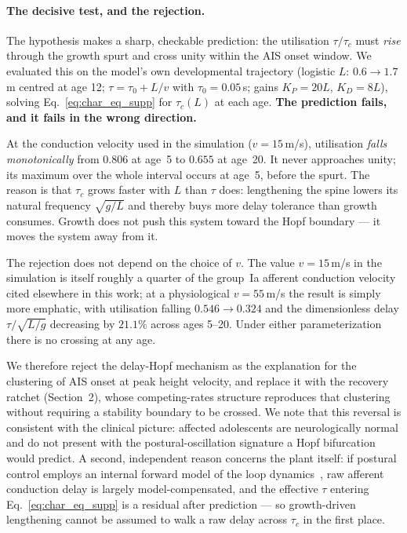 \paragraph{The decisive test, and the rejection.}
The hypothesis makes a sharp, checkable prediction: the utilisation $\tau/\tau_c$ must \emph{rise} through the growth spurt and cross unity within the AIS onset window. We evaluated this on the model's own developmental trajectory (logistic $L$: $0.6\to1.7$\,m centred at age 12; $\tau = \tau_0 + L/v$ with $\tau_0 = 0.05$\,s; gains $K_P = 20L$, $K_D = 8L$), solving Eq.~\ref{eq:char_eq_supp} for $\tau_c(L)$ at each age. \textbf{The prediction fails, and it fails in the wrong direction.}

At the conduction velocity used in the simulation ($v = 15$\,m/s), utilisation \emph{falls monotonically} from $0.806$ at age~5 to $0.655$ at age~20. It never approaches unity; its maximum over the whole interval occurs at age~5, before the spurt. The reason is that $\tau_c$ grows faster with $L$ than $\tau$ does: lengthening the spine lowers its natural frequency $\sqrt{g/L}$ and thereby buys more delay tolerance than growth consumes. Growth does not push this system toward the Hopf boundary --- it moves the system away from it.

The rejection does not depend on the choice of $v$. The value $v = 15$\,m/s in the simulation is itself roughly a quarter of the group~Ia afferent conduction velocity cited elsewhere in this work; at a physiological $v = 55$\,m/s the result is simply more emphatic, with utilisation falling $0.546 \to 0.324$ and the dimensionless delay $\tau/\sqrt{L/g}$ decreasing by $21.1\%$ across ages 5--20. Under either parameterization there is no crossing at any age.

We therefore reject the delay-Hopf mechanism as the explanation for the clustering of AIS onset at peak height velocity, and replace it with the recovery ratchet (Section~2), whose competing-rates structure reproduces that clustering without requiring a stability boundary to be crossed. We note that this reversal is consistent with the clinical picture: affected adolescents are neurologically normal and do not present with the postural-oscillation signature a Hopf bifurcation would predict. A second, independent reason concerns the plant itself: if postural control employs an internal forward model of the loop dynamics~\cite{wolpert1998internal}, raw afferent conduction delay is largely model-compensated, and the effective $\tau$ entering Eq.~\ref{eq:char_eq_supp} is a residual after prediction --- so growth-driven lengthening cannot be assumed to walk a raw delay across $\tau_c$ in the first place.

